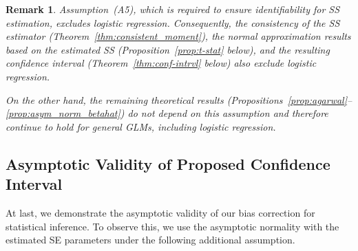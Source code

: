 \documentclass[12pt,reqno]{amsart}
\newtheorem{remark}{Remark}%
\newcommand{\cc}{\color{black}}
\newcommand{\ccc}{\color{black}}
\begin{document}
{\cc
\begin{remark}
Assumption~(A5), which is required to ensure identifiability for SS estimation, excludes logistic regression. Consequently, the consistency of the SS estimator (Theorem~\ref{thm:consistent_moment}), the normal approximation results based on the estimated SS (Proposition~\ref{prop:t-stat} below), and the resulting confidence interval (Theorem~\ref{thm:conf-intrvl} below) also exclude logistic regression.

On the other hand, the remaining theoretical results (Propositions~\ref{prop:agarwal}--\ref{prop:asym_norm_betahat}) do not depend on this assumption and therefore continue to hold for general GLMs, including logistic regression.
\end{remark}
}
\subsection{Asymptotic Validity of Proposed Confidence Interval}

At last, we demonstrate the asymptotic validity of our bias correction for statistical inference. 
To observe this, we use the asymptotic normality with the estimated SE parameters {\ccc under the following additional assumption}.
\end{document}

